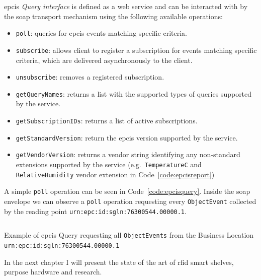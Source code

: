 \ac{epcis} \emph{Query interface} is defined as a web service and can be interacted with by the \ac{soap} transport mechanism using the following available operations: 

\begin{itemize}
    \item \texttt{poll}: queries for \ac{epcis} events matching specific criteria.
    \item \texttt{subscribe}: allows client to register a subscription for events matching specific criteria, which are delivered asynchronously to the client. 
    \item \texttt{unsubscribe}: removes a registered subscription.
    \item \texttt{getQueryNames}: returns a list with the supported types of queries supported by the service.
    \item \texttt{getSubscriptionIDs}: returns a list of active subscriptions.
    \item \texttt{getStandardVersion}: return the \ac{epcis} version supported by the service.
    \item \texttt{getVendorVersion}: returns a vendor string identifying any non-standard extensions supported by the service (e.g.\ \texttt{TemperatureC} and \texttt{RelativeHumidity} vendor extension in Code~\ref{code:epcisreport})
\end{itemize}

A simple \texttt{poll} operation can be seen in Code~\ref{code:epcisquery}. Inside the \ac{soap} envelope we can observe a \texttt{poll} operation requesting every \texttt{ObjectEvent} collected by the reading point \texttt{urn:epc:id:sgln:76300544.00000.1}. 

\begin{listing}
    \inputminted[linenos, breaklines]{xml}{./code/sota/EPCIS_query.xml}
    \caption{Example of \ac{epcis} Query requesting all \texttt{ObjectEvents} from the Business Location \texttt{urn:epc:id:sgln:76300544.00000.1}}
    \label{code:epcisquery}
\end{listing}

In the next chapter I will present the state of the art of \ac{rfid} smart shelves, purpose hardware and research.

\cleardoublepage